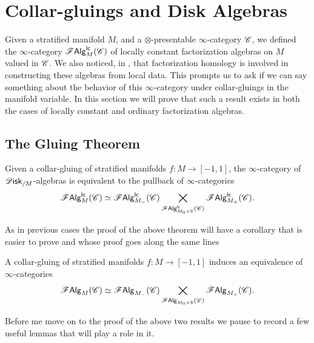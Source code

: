 \documentclass[../text]{subfiles}
\begin{document}
\section{Collar-gluings and Disk Algebras}\label{ch:gluing_disk_alg}

Given a stratified manifold $M$, and a $\otimes$-presentable $\infty$-category $\mathscr{C}$, we defined the $\infty$-category $\mathscr{F} \mathsf{Alg}^{\mathsf{lc}}_M (\mathscr{C})$ of locally constant factorization algebras on $M$ valued in $\mathscr{C}$. We also noticed, in , that factorization homology is involved in constructing these algebras from local data. This prompts us to ask if we can say something about the behavior of this $\infty$-category under collar-gluings in the manifold variable. In this section we will prove that such a result exists in both the cases of locally constant and ordinary factorization algebras.


\subsection{The Gluing Theorem}

\begin{theorem}\label{thm:gluing_lcfas}
    Given a collar-gluing of stratified manifolds $f: M \rightarrow [-1,1]$, the $\infty$-category of $\disk_{/M}$-algebras is equivalent to the pullback of $\infty$-categories
    \begin{equation}
        \mathscr{F} \mathsf{Alg}^{\mathsf{lc}}_M (\mathscr{C}) \simeq \mathscr{F} \mathsf{Alg}^{\mathsf{lc}}_{M_-} (\mathscr{C}) \bigtimes_{\mathscr{F} \mathsf{Alg}^{\mathsf{lc}}_{M_0 \times \mathbb{R}} (\mathscr{C})} \mathscr{F} \mathsf{Alg}^{\mathsf{lc}}_{M_+}(\mathscr{C}).
    \end{equation}
\end{theorem}

As in previous cases the proof of the above theorem will have a corollary that is easier to prove and whose proof goes along the same lines

\begin{corollary}\label{cor:gluing_falgs}
    A collar-gluing of stratified manifolds $f: M \rightarrow [-1,1]$ induces an equivalence of $\infty$-categories
    \begin{equation}
        \mathscr{F} \mathsf{Alg}_M (\mathscr{C}) \simeq \mathscr{F} \mathsf{Alg}_{M_-} (\mathscr{C}) \bigtimes_{\mathscr{F} \mathsf{Alg}_{M_0 \times \mathbb{R}} (\mathscr{C})} \mathscr{F} \mathsf{Alg}_{M_+}(\mathscr{C}).
    \end{equation}
\end{corollary}

Before me move on to the proof of the above two results we pause to record a few useful lemmas that will play a role in it.
\end{document}
